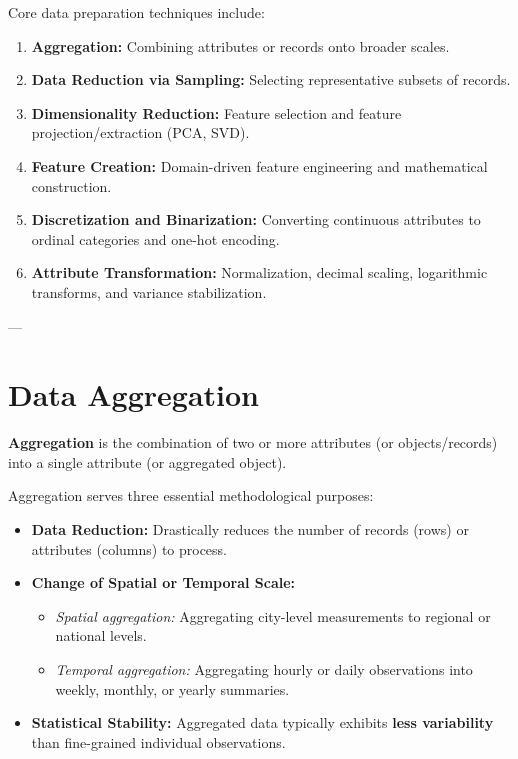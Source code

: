 Core data preparation techniques include:
\begin{enumerate}
    \item \textbf{Aggregation:} Combining attributes or records onto broader scales.
    \item \textbf{Data Reduction via Sampling:} Selecting representative subsets of records.
    \item \textbf{Dimensionality Reduction:} Feature selection and feature projection/extraction (PCA, SVD).
    \item \textbf{Feature Creation:} Domain-driven feature engineering and mathematical construction.
    \item \textbf{Discretization and Binarization:} Converting continuous attributes to ordinal categories and one-hot encoding.
    \item \textbf{Attribute Transformation:} Normalization, decimal scaling, logarithmic transforms, and variance stabilization.
\end{enumerate}

---

\section{Data Aggregation}

\begin{definition}[Aggregation]
\textbf{Aggregation} is the combination of two or more attributes (or objects/records) into a single attribute (or aggregated object).
\end{definition}

Aggregation serves three essential methodological purposes:
\begin{itemize}
    \item \textbf{Data Reduction:} Drastically reduces the number of records (rows) or attributes (columns) to process.
    \item \textbf{Change of Spatial or Temporal Scale:}
    \begin{itemize}
        \item \textit{Spatial aggregation:} Aggregating city-level measurements to regional or national levels.
        \item \textit{Temporal aggregation:} Aggregating hourly or daily observations into weekly, monthly, or yearly summaries.
    \end{itemize}
    \item \textbf{Statistical Stability:} Aggregated data typically exhibits \textbf{less variability} than fine-grained individual observations.
\end{itemize}

